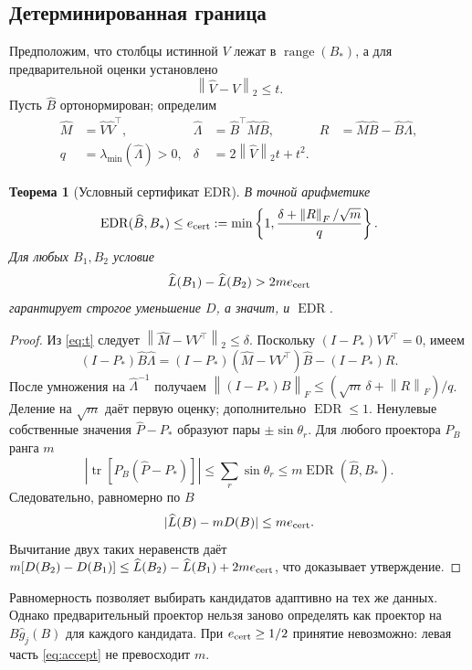 \documentclass[11pt,a4paper]{article}
\newcommand{\norm}[1]{\left\lVert#1\right\rVert}
\newcommand{\tr}{\operatorname{tr}}
\newcommand{\EDR}{\operatorname{EDR}}
\newtheorem{theorem}{Теорема}
\begin{document}
\subsection{Детерминированная граница}
Предположим, что столбцы истинной $V$ лежат в $\operatorname{range}(B_*)$,
а для предварительной оценки установлено
\begin{equation}\label{eq:t}
 \norm{\widehat V-V}_2\le t.
\end{equation}
Пусть $\widehat B$ ортонормирован; определим
\begin{align*}
 \widehat M&=\widehat V\widehat V^\top,&
 \widehat\Lambda&=\widehat B^\top\widehat M\widehat B,&
 R&=\widehat M\widehat B-\widehat B\widehat\Lambda,\\
 q&=\lambda_{\min}(\widehat\Lambda)>0,&
 \delta&=2\norm{\widehat V}_2t+t^2.
\end{align*}
\begin{theorem}[Условный сертификат EDR]\label{thm:certificate}
В точной арифметике
\begin{equation}\label{eq:certificate}
 \EDR(\widehat B,B_*)\le e_{\rm cert}
 :=\min\left\{1,\frac{\delta+\norm R_F/\sqrt m}{q}\right\}.
\end{equation}
Для любых $B_1,B_2$ условие
\begin{equation}\label{eq:accept}
 \widehat L(B_1)-\widehat L(B_2)>2m e_{\rm cert}
\end{equation}
гарантирует строгое уменьшение $D$, а значит, и $\EDR$.
\end{theorem}
\begin{proof}
Из \eqref{eq:t} следует
$\norm{\widehat M-VV^\top}_2\le\delta$.
Поскольку $(I-P_*)VV^\top=0$, имеем
\[
 (I-P_*)\widehat B\widehat\Lambda
 =(I-P_*)(\widehat M-VV^\top)\widehat B-(I-P_*)R.
\]
После умножения на $\widehat\Lambda^{-1}$ получаем
$\norm{(I-P_*)\widehat B}_F\le(\sqrt m\,\delta+\norm R_F)/q$.
Деление на $\sqrt m$ даёт первую оценку; дополнительно $\EDR\le1$.
Ненулевые собственные значения $\widehat P-P_*$ образуют пары
$\pm\sin\theta_r$. Для любого проектора $P_B$ ранга $m$
\[
 |\tr[P_B(\widehat P-P_*)]|
 \le\sum_r\sin\theta_r
 \le m\EDR(\widehat B,B_*).
\]
Следовательно, равномерно по $B$
\begin{equation}\label{eq:uniform}
 |\widehat L(B)-mD(B)|\le m e_{\rm cert}.
\end{equation}
Вычитание двух таких неравенств даёт
$m[D(B_2)-D(B_1)]\le\widehat L(B_2)-\widehat L(B_1)+2me_{\rm cert}$,
что доказывает утверждение.
\end{proof}
Равномерность позволяет выбирать кандидатов адаптивно на тех же данных.
Однако предварительный проектор нельзя заново определять как
проектор на $B\widehat g_j(B)$ для каждого кандидата.
При $e_{\rm cert}\ge1/2$ принятие невозможно: левая часть
\eqref{eq:accept} не превосходит $m$.
\end{document}
